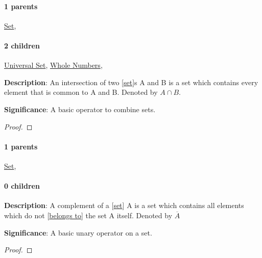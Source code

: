 \documentclass[../main.tex]{subfiles}
\begin{document}
\paragraph{1 parents} \hyperref[statement:Set]{Set}, 
\paragraph{2 children} \hyperref[statement:Universal Set]{Universal Set}, \hyperref[statement:Whole Numbers]{Whole Numbers}, 



\begin{statement}
\label{statement:Intersection}\hspace*{0pt}\par
\end{statement}
\textbf{Description}:
An intersection of two [\hyperref[statement:Set]{set}]s A and B is a set which contains every element that is common to A and B. Denoted by $ A \cap B $.
\par
{\color{magenta} \textbf{Significance}:
A basic operator to combine sets.
\par}
\begin{proof}
\proofbydefinition
\end{proof}\par
\paragraph{1 parents} \hyperref[statement:Set]{Set}, 
\paragraph{0 children} 



\begin{statement}
\label{statement:Complement}\hspace*{0pt}\par
\end{statement}
\textbf{Description}:
A complement of a [\hyperref[statement:Set]{set}] A is a set which contains all elements which do not [\hyperref[statement:Belongs To]{belongs to}] the set A itself. Denoted by $ \overline{A} $
\par
{\color{magenta} \textbf{Significance}:
A basic unary operator on a set.
\par}
\begin{proof}
\proofbydefinition
\end{proof}\par
\end{document}
